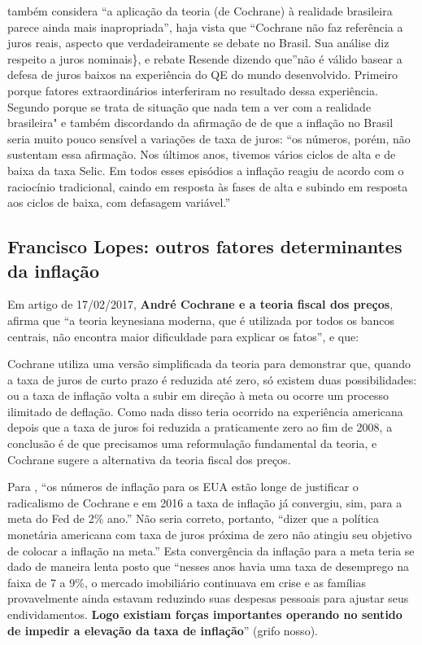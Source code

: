 \documentclass[
	10pt,				%
	openright,			%
	twoside,			%
	a5paper,			%
	english,			%
	french,				%
	spanish,			%
	brazil				%
	]{abntex2}
\renewenvironment{quote}
  {\small\list{}{\rightmargin=0.1cm \leftmargin=4cm}%
   \item\relax}
  {\endlist}
\begin{document}
 também considera ``a aplicação da teoria (de
Cochrane) à realidade brasileira parece ainda mais inapropriada'', haja
vista que ``Cochrane não faz referência a juros reais, aspecto que
verdadeiramente se debate no Brasil. Sua análise diz respeito a juros
nominais\}, e rebate Resende dizendo que''não é válido basear a defesa
de juros baixos na experiência do QE do mundo desenvolvido. Primeiro
porque fatores extraordinários interferiram no resultado dessa
experiência. Segundo porque se trata de situação que nada tem a ver com
a realidade brasileira" e também discordando da afirmação de
 de que a inflação no Brasil seria muito
pouco sensível a variações de taxa de juros: ``os números, porém, não
sustentam essa afirmação. Nos últimos anos, tivemos vários ciclos de
alta e de baixa da taxa Selic. Em todos esses episódios a inflação
reagiu de acordo com o raciocínio tradicional, caindo em resposta às
fases de alta e subindo em resposta aos ciclos de baixa, com defasagem
variável.''

\subsection{Francisco Lopes: outros fatores determinantes da
inflação}\label{francisco-lopes-outros-fatores-determinantes-da-inflauxe7uxe3o}

Em artigo de 17/02/2017, \textbf{André Cochrane e a teoria fiscal dos
preços},  afirma que ``a teoria keynesiana moderna,
que é utilizada por todos os bancos centrais, não encontra maior
dificuldade para explicar os fatos'', e que:

\begin{quote}
Cochrane utiliza uma versão simplificada da teoria para demonstrar que,
quando a taxa de juros de curto prazo é reduzida até zero, só existem
duas possibilidades: ou a taxa de inflação volta a subir em direção à
meta ou ocorre um processo ilimitado de deflação. Como nada disso teria
ocorrido na experiência americana depois que a taxa de juros foi
reduzida a praticamente zero ao fim de 2008, a conclusão é de que
precisamos uma reformulação fundamental da teoria, e Cochrane sugere a
alternativa da teoria fiscal dos preços.
\end{quote}

Para  , ``os números de inflação para os EUA
estão longe de justificar o radicalismo de Cochrane e em 2016 a taxa de
inflação já convergiu, sim, para a meta do Fed de 2\% ano.'' Não seria
correto, portanto, ``dizer que a política monetária americana com taxa
de juros próxima de zero não atingiu seu objetivo de colocar a inflação
na meta.'' Esta convergência da inflação para a meta teria se dado de
maneira lenta posto que ``nesses anos havia uma taxa de desemprego na
faixa de 7 a 9\%, o mercado imobiliário continuava em crise e as
famílias provavelmente ainda estavam reduzindo suas despesas pessoais
para ajustar seus endividamentos. \textbf{Logo existiam forças
importantes operando no sentido de impedir a elevação da taxa de
inflação}'' (grifo nosso).
\end{document}

